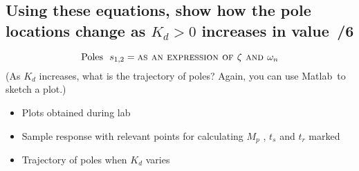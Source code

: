 \documentclass{article}
\newcommand{\score}{\hfill \underline{\hspace{0.65cm}}\,/} %
\newcommand\RR{\textsuperscript{\textregistered}~} %
\begin{document}
\subsection{Using these equations, show how the pole locations change as $K_d >0$ increases in value \score 6}
\[
    \mbox{Poles}~~s_{1,2} = \mbox{\sc as an expression of $\zeta$ and $\omega_n$}
\]
(As $K_d$ increases, what is the trajectory of poles? Again, you can use {\sc Matlab}\RR to sketch a plot.)
\newline \\[3mm]
\begin{itemize}
\item Plots obtained during lab
\item Sample response with relevant points for calculating $M_p$ , $t_s$ and $t_r$ marked
\item Trajectory of poles when $K_d$ varies 
\end{itemize}
\end{document}
